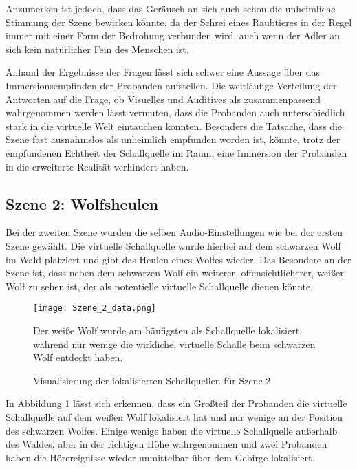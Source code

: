 Anzumerken ist jedoch, dass das Geräusch an sich auch schon die unheimliche Stimmung der Szene bewirken könnte, da der Schrei eines Raubtieres in der Regel immer mit einer Form der Bedrohung verbunden wird, auch wenn der Adler an sich kein natürlicher Fein des Menschen ist. 

Anhand der Ergebnisse der Fragen lässt sich schwer eine Aussage über das Immersionsempfinden der Probanden aufstellen. Die weitläufige Verteilung der Antworten auf die Frage, ob Visuelles und Auditives als zusammenpassend wahrgenommen werden lässt vermuten, dass die Probanden auch unterschiedlich stark in die virtuelle Welt eintauchen konnten. Besonders die Tatsache, dass die Szene fast ausnahmslos als unheimlich empfunden worden ist, könnte, trotz der empfundenen Echtheit der Schallquelle im Raum, eine Immersion der Probanden in die erweiterte Realität verhindert haben. \\

 \subsection{Szene 2: Wolfsheulen}
 Bei der zweiten Szene wurden die selben Audio-Einstellungen wie bei der ersten Szene gewählt. Die virtuelle Schallquelle wurde hierbei auf dem schwarzen Wolf im Wald platziert und gibt das Heulen eines Wolfes wieder. Das Besondere an der Szene ist, dass neben dem schwarzen Wolf ein weiterer, offensichtlicherer, weißer Wolf zu sehen ist, der als potentielle virtuelle Schallquelle dienen könnte. \\
 
\begin{figure}[H]
\centering
\texttt{[image: Szene\_2\_data.png]}
\caption{Visualisierung der lokalisierten Schallquellen für Szene 2}
Der weiße Wolf wurde am häufigsten als Schallquelle lokalisiert, während nur wenige die wirkliche, virtuelle Schalle beim schwarzen Wolf entdeckt haben. 
\label{fig:Szene_2_data}
\end{figure} 

 
In Abbildung \ref{fig:Szene_2_data} lässt sich erkennen, dass ein Großteil der Probanden die virtuelle Schallquelle auf dem weißen Wolf lokalisiert hat und nur wenige an der Position des schwarzen Wolfes. Einige wenige haben die virtuelle Schallquelle außerhalb des Waldes, aber in der richtigen Höhe wahrgenommen und zwei Probanden haben die Hörereignisse wieder unmittelbar über dem Gebirge lokalisiert.  \\

